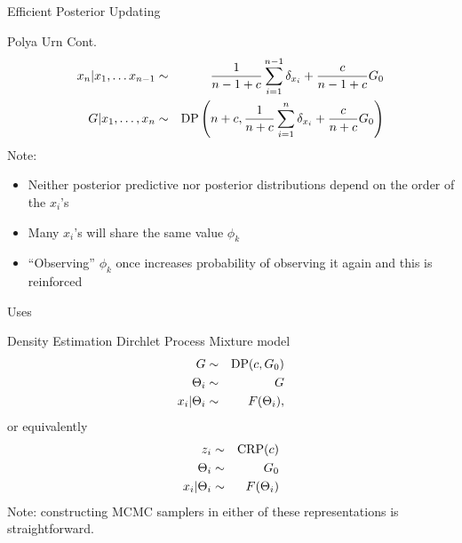 \begin{frame}[t]{Efficient Posterior Updating}
\begin{block}{Polya Urn \citep{Blackwell1973} Cont.}
\begin{eqnarray*}
x_n | x_1,\ldots x_{n-1} &\sim& \frac{1}{n-1+c}\sum_{i=1}^{n-1}\delta_{x_i} + \frac{c}{n-1+c}G_0 \\
G | x_1, \ldots, x_n &\sim& \DP\left(n+c, \frac{1}{n+c}\sum_{i=1}^n \delta_{x_i} + \frac{c}{n+c}G_0\right)
\end{eqnarray*}
Note: 
\begin{itemize}
\item Neither posterior predictive nor posterior distributions depend on the order of the $x_i$'s
\item Many $x_i$'s will share the same value $\phi_k$
\item ``Observing'' $\phi_k$ once increases probability of observing it again and this is reinforced
\end{itemize}
\end{block}
\end{frame}	

\begin{frame}[t]{Uses}
\begin{block}{Density Estimation}
Dirchlet Process Mixture model \citep{Escobar1995, MacEachern1998, Neal1998}
\begin{eqnarray*}
G &\sim& \DP(c,G_0) \\
\Theta_i &\sim& G \\
x_i | \Theta_i &\sim& F(\Theta_i),
\end{eqnarray*} 
or equivalently%
\begin{eqnarray*}
z_i &\sim& \CRP(c) \\
\Theta_i &\sim& G_0 \\
x_i | \Theta_i &\sim& F(\Theta_i)
\end{eqnarray*} 
Note: constructing MCMC samplers in either of these representations is straightforward.

\end{block}
\end{frame}	

